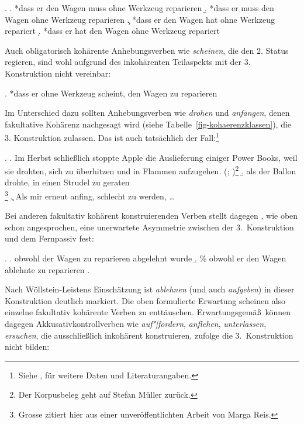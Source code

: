 \ex. \label{ex-3konstr-modal}
\a. *dass er den Wagen muss ohne Werkzeug reparieren \label{ex-3konstr-modal-a}
\b. *dass er muss den Wagen ohne Werkzeug reparieren \label{ex-3konstr-modal-b}
\c. *dass er den Wagen hat ohne Werkzeug repariert \label{ex-3konstr-modal-c}
\d. *dass er hat den Wagen ohne Werkzeug repariert \label{ex-3konstr-modal-d}

Auch obligatorisch kohärente Anhebungsverben wie {\it scheinen}, die den 2. Status regieren, sind wohl aufgrund des inkohärenten Teilaspekts mit der 3. Konstruktion nicht vereinbar:

\ex. *dass er ohne Werkzeug scheint, den Wagen zu reparieren\label{ex-3konstr-scheinen}

Im Unterschied dazu sollten Anhebungsverben wie {\it drohen} und {\it anfangen}, denen fakultative Kohärenz nachgesagt wird (siehe Tabelle~\ref{fig-kohaerenzklassen}), die 3. Konstruktion zulassen. Das ist auch tatsächlich der Fall:\footnote{Siehe \citet[Section~3.2.1]{Meurers:99}, \citet[Section~2.1.4.3]{Mueller:02} für weitere Daten und Literaturangaben.} 

{
\ex.
\a. Im Herbst schlie\ss lich stoppte Apple die Auslieferung einiger Power Books, weil sie drohten, sich zu überhitzen und in Flammen aufzugehen. \hfill (\citealt[(71a)]{Meurers:99}; \citealt[(111a)]{Mueller:02})\footnote{Der Korpusbeleg geht auf Stefan Müller zurück.} 
\b. als der Ballon drohte, in einen Strudel zu geraten \\ \citep[41a]{Grosse:05}\footnote{Grosse zitiert hier aus einer unveröffentlichten Arbeit von Marga Reis.}
\c. Als mir erneut anfing, schlecht zu werden, \ldots \\ \citep[(70a)]{Meurers:99}

}
\noindent Bei anderen fakultativ kohärent konstruierenden Verben stellt dagegen \cite{Woellstein:01}, wie oben schon angesprochen, eine unerwartete Asymmetrie zwischen der 3.~Konstruktion und dem Fernpassiv fest:

\ex. 
\a. obwohl der Wagen zu reparieren abgelehnt wurde
\b. \% obwohl er den Wagen ablehnte zu reparieren
\z. \citep[318]{Woellstein:01} 

Nach Wöllstein-Leistens Einschätzung ist {\it ablehnen} (und auch {\it aufgeben}) in dieser Konstruktion deutlich markiert. Die oben formulierte Erwartung scheinen also einzelne fakultativ kohärente Verben zu enttäuschen. Erwartungsgemä\ss\ können dagegen Akkusativkontrollverben wie {\it auf"|fordern}, {\it anflehen}, {\it unterlassen}, {\it ersuchen}, die ausschlie\ss lich inkohärent konstruieren, \cite{Grosse:05} zufolge die 3.~Konstruktion nicht bilden:

